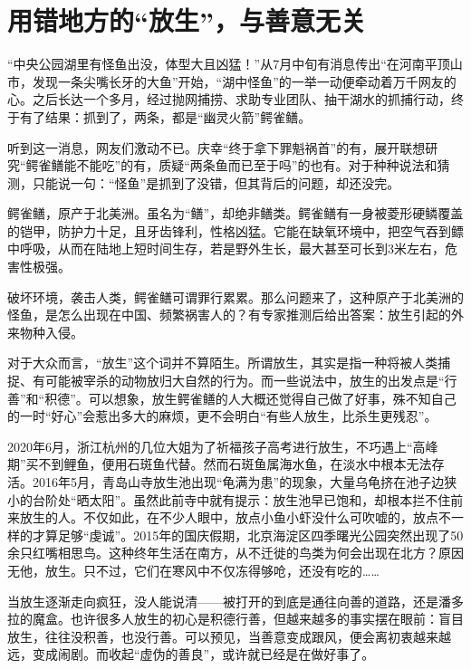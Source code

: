 
\section*{用错地方的“放生”，与善意无关}

“中央公园湖里有怪鱼出没，体型大且凶猛！”从7月中旬有消息传出“在河南平顶山市，发现一条尖嘴长牙的大鱼”开始，“湖中怪鱼”的一举一动便牵动着万千网友的心。之后长达一个多月，经过抛网捕捞、求助专业团队、抽干湖水的抓捕行动，终于有了结果：抓到了，两条，都是“幽灵火箭”鳄雀鳝。

听到这一消息，网友们激动不已。庆幸“终于拿下罪魁祸首”的有，展开联想研究“鳄雀鳝能不能吃”的有，质疑“两条鱼而已至于吗”的也有。对于种种说法和猜测，只能说一句：“怪鱼”是抓到了没错，但其背后的问题，却还没完。

鳄雀鳝，原产于北美洲。虽名为“鳝”，却绝非鳝类。鳄雀鳝有一身被菱形硬鳞覆盖的铠甲，防护力十足，且牙齿锋利，性格凶猛。它能在缺氧环境中，把空气吞到鳔中呼吸，从而在陆地上短时间生存，若是野外生长，最大甚至可长到3米左右，危害性极强。

破坏环境，袭击人类，鳄雀鳝可谓罪行累累。那么问题来了，这种原产于北美洲的怪鱼，是怎么出现在中国、频繁祸害人的？有专家推测后给出答案：放生引起的外来物种入侵。

对于大众而言，“放生”这个词并不算陌生。所谓放生，其实是指一种将被人类捕捉、有可能被宰杀的动物放归大自然的行为。而一些说法中，放生的出发点是“行善”和“积德”。可以想象，放生鳄雀鳝的人大概还觉得自己做了好事，殊不知自己的一时“好心”会惹出多大的麻烦，更不会明白“有些人放生，比杀生更残忍”。

2020年6月，浙江杭州的几位大姐为了祈福孩子高考进行放生，不巧遇上“高峰期”买不到鲤鱼，便用石斑鱼代替。然而石斑鱼属海水鱼，在淡水中根本无法存活。2016年5月，青岛山寺放生池出现“龟满为患”的现象，大量乌龟挤在池子边狭小的台阶处“晒太阳”。虽然此前寺中就有提示：放生池早已饱和，却根本拦不住前来放生的人。不仅如此，在不少人眼中，放点小鱼小虾没什么可吹嘘的，放点不一样的才算足够“虔诚”。2015年的国庆假期，北京海淀区四季曙光公园突然出现了50余只红嘴相思鸟。这种终年生活在南方，从不迁徙的鸟类为何会出现在北方？原因无他，放生。只不过，它们在寒风中不仅冻得够呛，还没有吃的……

当放生逐渐走向疯狂，没人能说清——被打开的到底是通往向善的道路，还是潘多拉的魔盒。也许很多人放生的初心是积德行善，但越来越多的事实摆在眼前：盲目放生，往往没积善，也没行善。可以预见，当善意变成跟风，便会离初衷越来越远，变成闹剧。而收起“虚伪的善良”，或许就已经是在做好事了。

